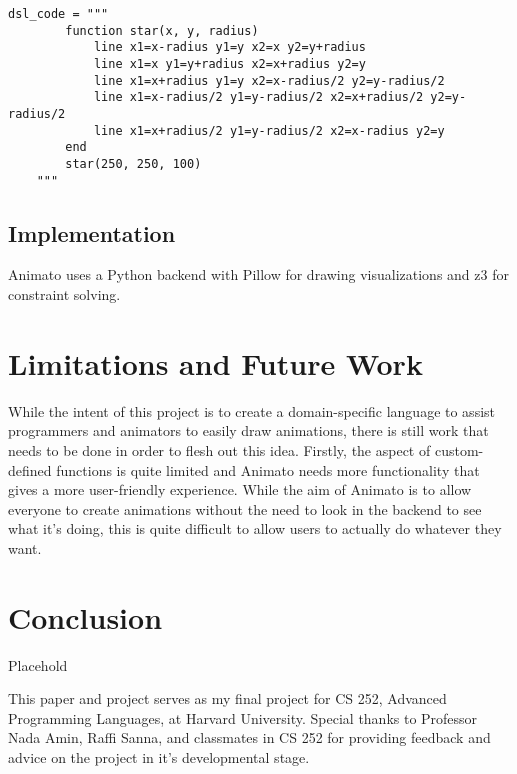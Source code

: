 \documentclass[acmsmall,screen]{acmart}
\begin{document}
\begin{lstlisting}[label=Sample custom function definition in Animato]
    dsl_code = """
        function star(x, y, radius)
            line x1=x-radius y1=y x2=x y2=y+radius
            line x1=x y1=y+radius x2=x+radius y2=y
            line x1=x+radius y1=y x2=x-radius/2 y2=y-radius/2
            line x1=x-radius/2 y1=y-radius/2 x2=x+radius/2 y2=y-radius/2
            line x1=x+radius/2 y1=y-radius/2 x2=x-radius y2=y
        end
        star(250, 250, 100)
    """
\end{lstlisting}

\subsection{Implementation}
Animato uses a Python backend with Pillow for drawing visualizations and z3 for constraint solving.

\section{Limitations and Future Work}
While the intent of this project is to create a domain-specific language to assist programmers and animators to easily draw animations, there is still work that needs to be done in order to flesh out this idea.
Firstly, the aspect of custom-defined functions is quite limited and Animato needs more functionality that gives a more user-friendly experience.
While the aim of Animato is to allow everyone to create animations without the need to look in the backend to see what it's doing, this is quite difficult to allow users to actually do whatever they want.

\section{Conclusion}
Placehold

\begin{acks}
This paper and project serves as my final project for CS 252, Advanced Programming Languages, at Harvard University. Special thanks to Professor Nada Amin, Raffi Sanna, and classmates in CS 252 for providing feedback and advice on the project in it's developmental stage.
\end{acks}



\end{document}
